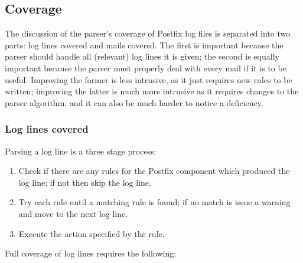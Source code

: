 \subsection{Coverage}

\label{parsing coverage}

The discussion of the parser's coverage of Postfix log files is separated
into two parts: log lines covered and mails covered.  The first is
important because the parser should handle all (relevant) log lines it is
given; the second is equally important because the parser must properly
deal with every mail if it is to be useful.  Improving the former is
less intrusive, as it just requires new rules to be written; improving the
latter is much more intrusive as it requires changes to the parser
algorithm, and it can also be much harder to notice a deficiency.

\subsubsection{Log lines covered}

\label{log-lines-covered}

Parsing a log line is a three stage process:

\begin{enumerate}

    \item Check if there are any rules for the Postfix component which
        produced the log line; if not then skip the log line.

    \item Try each rule until a matching rule is found; if no match is
        issue a warning and move to the next log line.

    \item Execute the action specified by the rule.

\end{enumerate}

Full coverage of log lines requires the following:


